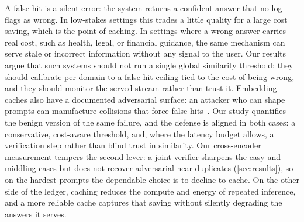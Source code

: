 A false hit is a silent error: the system returns a confident answer that no log flags as
wrong. In low-stakes settings this trades a little quality for a large cost saving, which is
the point of caching. In settings where a wrong answer carries real cost, such as health,
legal, or financial guidance, the same mechanism can serve stale or incorrect information
without any signal to the user. Our results argue that such systems should not run a single
global similarity threshold; they should calibrate per domain to a false-hit ceiling tied to
the cost of being wrong, and they should monitor the served stream rather than trust it.
Embedding caches also have a documented adversarial surface: an attacker who can shape
prompts can manufacture collisions that force false hits~\cite{zhang2026keycollision}. Our
study quantifies the benign version of the same failure, and the defense is aligned in both
cases: a conservative, cost-aware threshold, and, where the latency budget allows, a
verification step rather than blind trust in similarity. Our cross-encoder measurement tempers
the second lever: a joint verifier sharpens the easy and middling cases but does not recover
adversarial near-duplicates (\cref{sec:results}), so on the hardest prompts the dependable
choice is to decline to cache. On the other side of the ledger, caching reduces the compute and energy
of repeated inference, and a more reliable cache captures that saving without silently
degrading the answers it serves.
